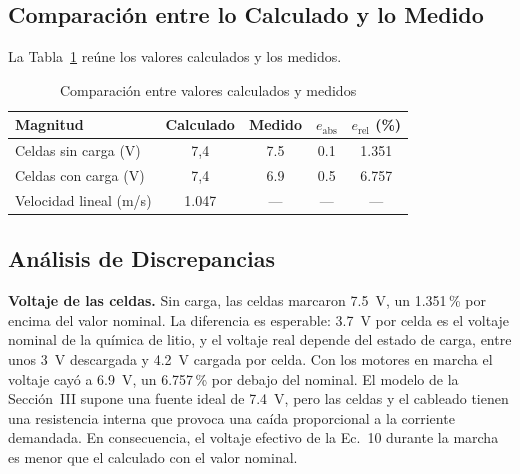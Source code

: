 \documentclass[conference]{IEEEtran}
\newcommand{\valSpeedLimited}{1.047}
\newcommand{\valBatteryNoLoadMeasured}{7.5}
\newcommand{\valBatteryLoadMeasured}{6.9}
\newcommand{\valBatteryNoLoadAbsError}{0.1}
\newcommand{\valBatteryNoLoadRelErrorPct}{1.351}
\newcommand{\valBatteryLoadAbsError}{0.5}
\newcommand{\valBatteryLoadRelErrorPct}{6.757}
\begin{document}
\subsection{Comparación entre lo Calculado y lo Medido}
La Tabla~\ref{tab:comparacion} reúne los valores calculados y los medidos.

\begin{table}[!t]
\caption{Comparación entre valores calculados y medidos}
\label{tab:comparacion}
\centering
\begin{tabular}{@{}lcccc@{}}
\toprule
Magnitud & Calculado & Medido & $e_{\text{abs}}$ & $e_{\text{rel}}$ (\%) \\
\midrule
Celdas sin carga (V) & 7,4 & \num{\valBatteryNoLoadMeasured} & \num{\valBatteryNoLoadAbsError} & \num[round-mode=places,round-precision=2]{\valBatteryNoLoadRelErrorPct} \\
Celdas con carga (V) & 7,4 & \num{\valBatteryLoadMeasured} & \num{\valBatteryLoadAbsError} & \num[round-mode=places,round-precision=2]{\valBatteryLoadRelErrorPct} \\
Velocidad lineal (m/s) & \num[round-mode=places,round-precision=3]{\valSpeedLimited} & --- & --- & --- \\
\bottomrule
\end{tabular}
\end{table}

\subsection{Análisis de Discrepancias}
\textbf{Voltaje de las celdas.} Sin carga, las celdas marcaron \SI{\valBatteryNoLoadMeasured}{V}, un \num[round-mode=places,round-precision=2]{\valBatteryNoLoadRelErrorPct}\,\% por encima del valor nominal. La diferencia es esperable: \SI{3.7}{V} por celda es el voltaje nominal de la química de litio, y el voltaje real depende del estado de carga, entre unos \SI{3}{V} descargada y \SI{4.2}{V} cargada por celda. Con los motores en marcha el voltaje cayó a \SI{\valBatteryLoadMeasured}{V}, un \num[round-mode=places,round-precision=2]{\valBatteryLoadRelErrorPct}\,\% por debajo del nominal. El modelo de la Sección~III supone una fuente ideal de \SI{7.4}{V}, pero las celdas y el cableado tienen una resistencia interna que provoca una caída proporcional a la corriente demandada. En consecuencia, el voltaje efectivo de la Ec.~10 durante la marcha es menor que el calculado con el valor nominal.
\end{document}
